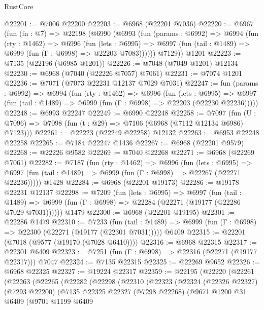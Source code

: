 \begin{lexlean}{RustCore}
\begin{coremodule}
@22201 := @7006 @22200
@22203 := @6968 (@22201 @7036)
@22220 := @6967
    (fun (fn : @7) =>
    @22198
      (@6990
        (@6993
          (fun (params : @6992) =>
          @6994
            (fun (rty : @1462) =>
            @6996
              (fun (lets : @6995) =>
              @6997 (fun (tail : @1489) => @6999 (fun (Γ : @6998) => @22203 @7083))))))
        @7129))
    @1201
@22223 := @7135 (@22196 (@6985 @1201))
@22226 := @7048 (@7049 @1201) @12134
@22230 := @6968 (@7040 (@22226 @7057) @7061)
@22231 := @7074 @1201
@22236 := @7071 (@7073 @22231 @12137 @7029 @7031)
@22247 := fun (params : @6992) =>
  @6994
    (fun (rty : @1462) =>
    @6996
      (fun (lets : @6995) =>
      @6997 (fun (tail : @1489) => @6999 (fun (Γ : @6998) => @22203 (@22230 @22236)))))
@22248 := @6993 @22247
@22249 := @6990 @22248
@22258 := @7097
    (fun (U : @7096) => @7098 (fun (t : @29) => @7106 (@6968 (@7112 @12134 @6986) @7123)))
@22261 := @22223 (@22249 @22258) @12132
@22263 := @6953 @22248 @22258
@22265 := @7184 @22247 @1436
@22267 := @6968 (@22201 @9579)
@22268 := @22226 @9582
@22269 := @7040 @22268
@22271 := @6968 (@22269 @7061)
@22282 := @7187
    (fun (rty : @1462) =>
    @6996
      (fun (lets : @6995) =>
      @6997 (fun (tail : @1489) => @6999 (fun (Γ : @6998) => @22267 (@22271 @22236)))))
    @1428
@22284 := @6968 (@22201 @19173)
@22286 := @19178 @22231 @12137
@22298 := @7209
    (fun (lets : @6995) =>
    @6997
      (fun (tail : @1489) =>
      @6999 (fun (Γ : @6998) => @22284 (@22271 (@19177 (@22286 @7029 @7031))))))
    @1479
@22300 := @6968 (@22201 @19195)
@22301 := @22286 @1479
@22310 := @7233
    (fun (tail : @1489) => @6999 (fun (Γ : @6998) => @22300 (@22271 (@19177 (@22301 @7031)))))
    @6409
@22315 := @22201 (@7018 (@9577 (@19170 (@7028 @6410))))
@22316 := @6968 @22315
@22317 := @22301 @6409
@22323 := @7251 (fun (Γ : @6998) => @22316 (@22271 (@19177 @22317))) @7047
@22324 := @7135 @22315
@22325 := @22269 @9652
@22326 := @6968 @22325
@22327 := @19224 @22317
@22359 := @22195
    (@22220
      (@22261
        (@22263
          (@22265
            (@22282
              (@22298
                (@22310
                  (@22323
                    (@22324
                      (@22326 @22327)
                      (@7293 @22200)
                      (@7135
                        @22325
                        @22327
                        (@7298 @22268)
                        (@9671
                          @1200
                          @31
                          @6409
                          (@9701
                            @1199
                            @6409

\end{coremodule}
\end{lexlean}
